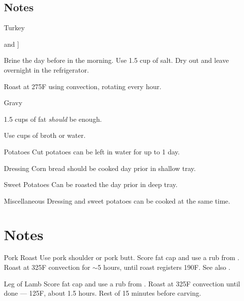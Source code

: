 \documentclass[oneside]{book}  %
\def\thisrecipe{}  %
\newcommand{\recipe}[1]{\section{#1}\def\thisrecipe{: #1}} %
\newcommand{\degF}{\textdegree F\xspace}
\newcommand{\about}{$\sim$}
\begin{document}
\subsection{Notes}
\begin{twocols} \begin{kitchennotes}
  \item[Turkey] \begin{kitchensubnotes}
    \item \todo[cf.\ \CICookbook[353] and \CIMeat[439]]
    \item Brine the day before in the morning. Use 1.5 cup of salt. Dry out and
      leave overnight in the refrigerator.
    \item Roast at 275\degF using convection, rotating every hour. 
  \end{kitchensubnotes}

  \item[Gravy] \begin{kitchensubnotes}
    \item 1.5 cups of fat \emph{should} be enough.
    \item Use  cups of broth or water.
  \end{kitchensubnotes}

  \item[Potatoes]
  Cut potatoes can be left in water for up to 1 day.

  \item[Dressing]
  Corn bread should be cooked day prior in shallow tray.

  \item[Sweet Potatoes]
  Can be roasted the day prior in deep tray.

  \item[Miscellaneous]
    Dressing and sweet potatoes can be cooked at the same time.
\end{kitchennotes} \end{twocols}
\recipe{Notes} \label{notes:dinners_leftovers} %
\begin{kitchennotes}
  \item[Pork Roast]  
    Use pork shoulder or pork butt. Score fat cap and use a rub from
    . Roast at 325\degF convection for
    \about 5 hours, until roast registers 190\degF. See also \CICookbook[418].
  \item[Leg of Lamb]  
    Score fat cap and use a rub from . Roast
    at 325\degF convection until done --- 125\degF, about 1.5 hours. Rest of 15
    minutes before carving.
\end{kitchennotes}
\end{document}
